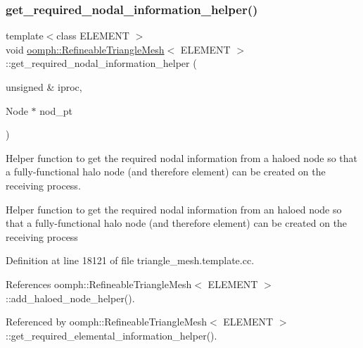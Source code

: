 \subsubsection{\texorpdfstring{get\+\_\+required\+\_\+nodal\+\_\+information\+\_\+helper()}{get\_required\_nodal\_information\_helper()}}
{\footnotesize\ttfamily template$<$class E\+L\+E\+M\+E\+NT $>$ \\
void \hyperlink{classoomph_1_1RefineableTriangleMesh}{oomph\+::\+Refineable\+Triangle\+Mesh}$<$ E\+L\+E\+M\+E\+NT $>$\+::get\+\_\+required\+\_\+nodal\+\_\+information\+\_\+helper (\begin{DoxyParamCaption}\item[{unsigned \&}]{iproc,  }\item[{Node $\ast$}]{nod\+\_\+pt }\end{DoxyParamCaption})\hspace{0.3cm}{\ttfamily [protected]}}



Helper function to get the required nodal information from a haloed node so that a fully-\/functional halo node (and therefore element) can be created on the receiving process. 

Helper function to get the required nodal information from an haloed node so that a fully-\/functional halo node (and therefore element) can be created on the receiving process 

Definition at line 18121 of file triangle\+\_\+mesh.\+template.\+cc.



References oomph\+::\+Refineable\+Triangle\+Mesh$<$ E\+L\+E\+M\+E\+N\+T $>$\+::add\+\_\+haloed\+\_\+node\+\_\+helper().



Referenced by oomph\+::\+Refineable\+Triangle\+Mesh$<$ E\+L\+E\+M\+E\+N\+T $>$\+::get\+\_\+required\+\_\+elemental\+\_\+information\+\_\+helper().

\mbox{\label{classoomph_1_1RefineableTriangleMesh_a96166ff7172e5ea1ba299ffb65d462bc}} 
